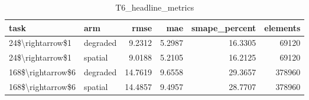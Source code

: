 \begin{table}
\caption{T6_headline_metrics}
\label{tab:T6_headline_metrics}
\begin{tabular}{llrrrr}
\toprule
task & arm & rmse & mae & smape\_percent & elements \\
\midrule
24\$\textbackslash rightarrow\$1 & degraded & 9.2312 & 5.2987 & 16.3305 & 69120 \\
24\$\textbackslash rightarrow\$1 & spatial & 9.0188 & 5.2105 & 16.2125 & 69120 \\
168\$\textbackslash rightarrow\$6 & degraded & 14.7619 & 9.6558 & 29.3657 & 378960 \\
168\$\textbackslash rightarrow\$6 & spatial & 14.4857 & 9.4957 & 28.7707 & 378960 \\
\bottomrule
\end{tabular}
\end{table}

